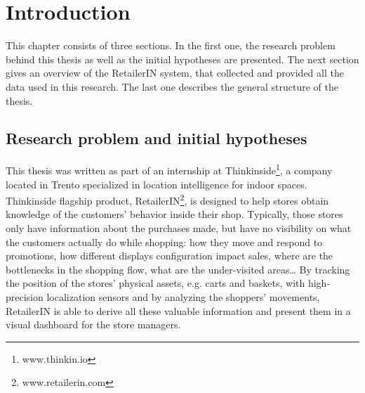 \chapter{Introduction}
\label{cha:introduction}

This chapter consists of three sections. In the first one, the research problem behind this thesis as well as the initial hypotheses are presented. The next section gives an overview of the RetailerIN system, that collected and provided all the data used in this research. The last one describes the general structure of the thesis.

\section{Research problem and initial hypotheses}
\label{sec:research_problem_and_initial_hypoteses}

This thesis was written as part of an internship at Thinkinside\footnote{www.thinkin.io}, a company located in Trento specialized in location intelligence for indoor spaces. Thinkinside flagship product, RetailerIN\footnote{www.retailerin.com}, is designed to help stores obtain knowledge of the customers’ behavior inside their shop. Typically, those stores only have information about the purchases made, but have no visibility on what the customers actually do while shopping: how they move and respond to promotions, how different displays configuration impact sales, where are the bottlenecks in the shopping flow, what are the under-visited areas… By tracking the position of the stores’ physical assets, e.g. carts and baskets, with high-precision localization sensors and by analyzing the shoppers’ movements, RetailerIN is able to derive all these valuable information and present them in a visual dashboard for the store managers.

